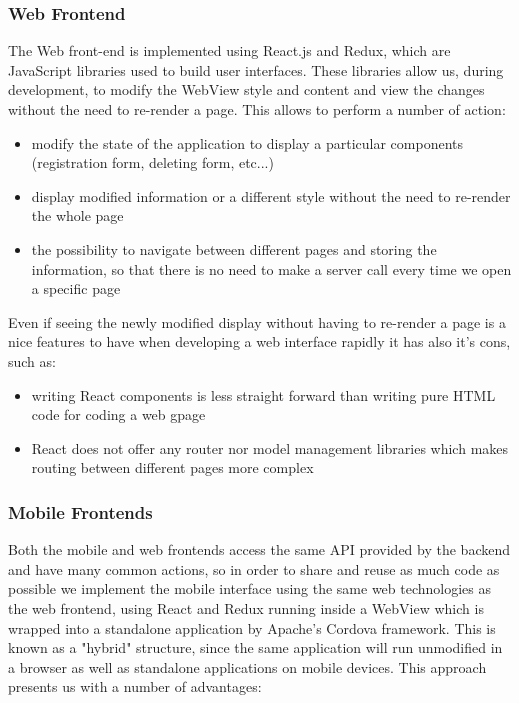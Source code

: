 \subsubsection{Web Frontend}
The Web front-end is implemented using React.js and Redux, which are JavaScript libraries used to build user interfaces. These libraries allow us, during development, to modify the WebView style and content and view the changes without the need to re-render a page. This allows to perform a number of action:

\begin{itemize}
	\item modify the state of the application to display a particular components (registration form, deleting form, etc...)
	\item display modified information or a different style without the need to re-render the whole page
	\item the possibility to navigate between different pages and storing the information, so that there is no need to make a server call every time we open a specific page
\end{itemize}

Even if seeing the newly modified display without having to re-render a page is a nice features to have when developing a web interface rapidly it has also it's cons, such as:
\begin{itemize}
	\item writing React components is less straight forward than writing pure HTML code for coding a web gpage
	\item React does not offer any router nor model management libraries which makes routing between different pages more complex
\end{itemize} 

\subsubsection{Mobile Frontends}

Both the mobile and web frontends access the same API provided by the backend and have many common actions, so in order to share and reuse as much code as possible we implement the mobile interface using the same web technologies as the web frontend, using React and Redux running inside a WebView which is wrapped into a standalone application by Apache's Cordova framework. This is known as a "hybrid" structure, since the same application will run unmodified in a browser as well as standalone applications on mobile devices. This approach presents us with a number of advantages:

